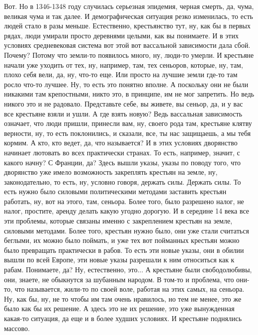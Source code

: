 Вот. Но в 1346-1348 году случилась серьезная эпидемия, черная смерть, да, чума,
великая чума и так далее. И демографическая ситуация резко изменилась, то есть
людей стало в разы меньше. Естественно, крестьянство тут, ну, как бы в первых
рядах, люди умирали просто деревнями целыми, как вы понимаете. И в этих условиях
средневековая система вот этой вот вассальной зависимости дала сбой. Почему?
Потому что земли-то появилось много, ну, люди-то умерли. И крестьяне начали уже
уходить от тех, ну, например, там, тех сеньоров, которые, ну, там, плохо себя
вели, да, ну, что-то еще. Или просто на лучшие земли где-то там росло что-то
лучшее. Ну, то есть это понятно вполне. А поскольку они не были никакими там
крепостными, никто это, в принципе, им не мог запретить. Но ведь никого это и не
радовало. Представьте себе, вы живете, вы сеньор, да, и у вас все крестьяне
взяли и ушли. А где взять новую? Ведь вассальная зависимость означает, что люди
пришли, принесли вам, ну, своего рода там, крестьяне клятву верности, ну, то
есть поклонились, и сказали, все, ты нас защищаешь, а мы тебя кормим. А кто, кто
ведет, да, что называется? И в этих условиях дворянство начинает лютовать во
всех практически странах. То есть, например, значит, с какого начну? С Франции,
да? Здесь вышли указы, указы по поводу того, что дворянство уже имело
возможность закреплять крестьян на земле, ну, законодательно, то есть, ну,
условно говоря, держать силы. Держать силы. То есть нужно было силовыми
политическими методами заставить крестьян работать, ну, вот на этого, там,
сеньора. Более того, было разрешено налог, не налог, простите, аренду делать
какую угодно дорогую. И в середине 14 века все эти проблемы, которые связаны
именно с закреплением крестьян на земле, силовыми методами. Более того, крестьян
нужно было, они уже стали считаться беглыми, их можно было поймать, и уже тех
вот пойманных крестьян можно было превращать практически в рабов. То есть эти
новые указы, они в обилии вышли по всей Европе, эти новые указы разрешали к ним
относиться как к рабам. Понимаете, да? Ну, естественно, это... А крестьяне были
свободолюбивы, они, знаете, не обыкнутся за шубанным народом. В том-то и
проблема, что они-то, что называется, жили-то по своей воле, работая на этих
самых, на сеньора. Ну, как бы, ну, не то чтобы им там очень нравилось, но тем не
менее, это же было как бы их решение. А здесь это не их решение, это уже
вынужденная какая-то ситуация, да еще и в более худших условиях. И крестьяне
поднялись массово. 

